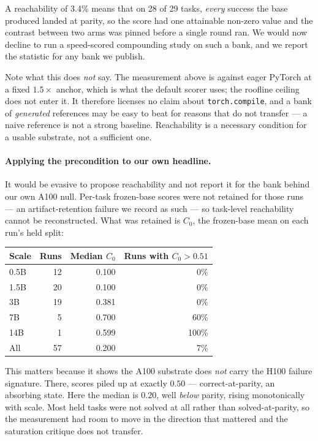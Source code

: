 A reachability of 3.4\% means that on 28 of 29 tasks, \emph{every} success the base produced
landed at parity, so the score had one attainable non-zero value and the contrast between two
arms was pinned before a single round ran. We would now decline to run a speed-scored
compounding study on such a bank, and we report the statistic for any bank we publish.

Note what this does \emph{not} say. The measurement above is against eager PyTorch at a fixed
$1.5\times$ anchor, which is what the default scorer uses; the roofline ceiling does not enter
it. It therefore licenses no claim about \texttt{torch.compile}, and a bank of \emph{generated}
references may be easy to beat for reasons that do not transfer --- a naive reference is not a
strong baseline. Reachability is a necessary condition for a usable substrate, not a sufficient
one.

\paragraph{Applying the precondition to our own headline.}
It would be evasive to propose reachability and not report it for the bank behind our own
A100 null. Per-task frozen-base scores were not retained for those runs --- an
artifact-retention failure we record as such --- so task-level reachability cannot be
reconstructed. What was retained is $C_0$, the frozen-base mean on each run's held split:

\begin{center}\small
\begin{tabular}{@{}lrrr@{}}
\toprule
\textbf{Scale} & \textbf{Runs} & \textbf{Median $C_0$} & \textbf{Runs with $C_0 > 0.51$} \\
\midrule
0.5B & 12 & 0.100 & 0\% \\
1.5B & 20 & 0.100 & 0\% \\
3B   & 19 & 0.381 & 0\% \\
7B   & 5  & 0.700 & 60\% \\
14B  & 1  & 0.599 & 100\% \\
\midrule
All  & 57 & 0.200 & 7\% \\
\bottomrule
\end{tabular}
\end{center}

\noindent This matters because it shows the A100 substrate does \emph{not} carry the H100
failure signature. There, scores piled up at exactly $0.50$ --- correct-at-parity, an absorbing
state. Here the median is $0.20$, well \emph{below} parity, rising monotonically with scale.
Most held tasks were not solved at all rather than solved-at-parity, so the measurement had room
to move in the direction that mattered and the saturation critique does not transfer.

